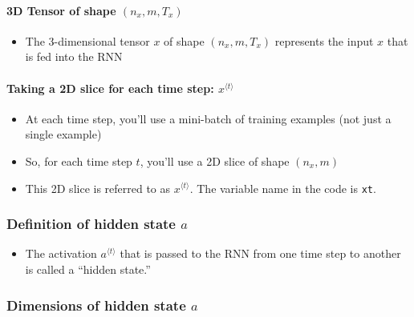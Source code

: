 \documentclass[11pt]{article}
\providecommand{\tightlist}{%
      \setlength{\itemsep}{0pt}\setlength{\parskip}{0pt}}
\begin{document}
    \hypertarget{d-tensor-of-shape-n_xmt_x}{%
\paragraph{\texorpdfstring{3D Tensor of shape
\((n_{x},m,T_{x})\)}{3D Tensor of shape (n\_\{x\},m,T\_\{x\})}}\label{d-tensor-of-shape-n_xmt_x}}

\begin{itemize}
\tightlist
\item
  The 3-dimensional tensor \(x\) of shape \((n_x,m,T_x)\) represents the
  input \(x\) that is fed into the RNN
\end{itemize}

\hypertarget{taking-a-2d-slice-for-each-time-step-xlangle-t-rangle}{%
\paragraph{\texorpdfstring{Taking a 2D slice for each time step:
\(x^{\langle t \rangle}\)}{Taking a 2D slice for each time step: x\^{}\{\textbackslash langle t \textbackslash rangle\}}}\label{taking-a-2d-slice-for-each-time-step-xlangle-t-rangle}}

\begin{itemize}
\tightlist
\item
  At each time step, you'll use a mini-batch of training examples (not
  just a single example)
\item
  So, for each time step \(t\), you'll use a 2D slice of shape
  \((n_x,m)\)
\item
  This 2D slice is referred to as \(x^{\langle t \rangle}\). The
  variable name in the code is \texttt{xt}.
\end{itemize}

    \hypertarget{definition-of-hidden-state-a}{%
\subsubsection{\texorpdfstring{Definition of hidden state
\(a\)}{Definition of hidden state a}}\label{definition-of-hidden-state-a}}

\begin{itemize}
\tightlist
\item
  The activation \(a^{\langle t \rangle}\) that is passed to the RNN
  from one time step to another is called a ``hidden state.''
\end{itemize}

\hypertarget{dimensions-of-hidden-state-a}{%
\subsubsection{\texorpdfstring{Dimensions of hidden state
\(a\)}{Dimensions of hidden state a}}\label{dimensions-of-hidden-state-a}}
\end{document}
